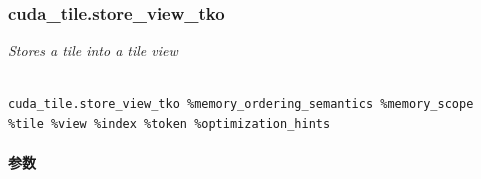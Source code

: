 \documentclass{article}
\begin{document}
\subsubsection{cuda\_tile.store\_view\_tko}


\textit{Stores a tile into a tile view}




\begin{lstlisting}

cuda_tile.store_view_tko %memory_ordering_semantics %memory_scope %tile %view %index %token %optimization_hints

\end{lstlisting}



\paragraph{参数}
\end{document}
